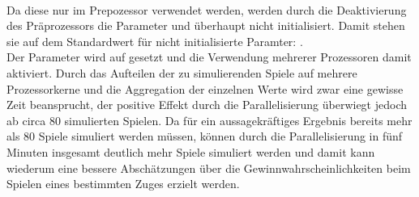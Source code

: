 \\Da diese nur im Prepozessor verwendet werden, werden durch die Deaktivierung des Präprozessors die Parameter  und  überhaupt nicht initialisiert. Damit stehen sie auf dem Standardwert für nicht initialisierte Paramter: .
\\Der Parameter  wird auf  gesetzt und die Verwendung mehrerer Prozessoren damit aktiviert. Durch das Aufteilen der zu simulierenden Spiele auf mehrere Prozessorkerne und die Aggregation der einzelnen Werte wird zwar eine gewisse Zeit beansprucht, der positive Effekt durch die Parallelisierung überwiegt jedoch ab circa 80 simulierten Spielen. Da für ein aussagekräftiges Ergebnis bereits mehr als 80 Spiele simuliert werden müssen, können durch die Parallelisierung in fünf Minuten insgesamt deutlich mehr Spiele simuliert werden und damit kann wiederum eine bessere Abschätzungen über die Gewinnwahrscheinlichkeiten beim Spielen eines bestimmten Zuges erzielt werden.
\newpage
